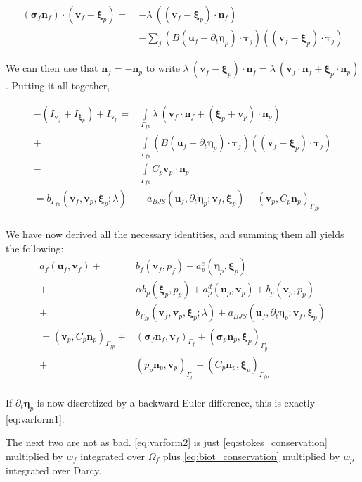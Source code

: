 \documentclass{article}
\newcommand{\mathspace}[1]{\ensuremath{#1}\xspace} %
\newcommand{\sigmabf}{\mathspace{\boldsymbol{\sigma}}}
\newcommand{\inner}[2]{\mathspace{\left (#1, #2 \right)}}
\newcommand{\ddt}[1]{\mathspace{\partial_t #1}}
\newcommand{\taubf}{\mathspace{\boldsymbol{\tau}}}
\newcommand{\stokes}{\mathspace{\Omega_{f}}}
\newcommand{\stokesbdy}{\mathspace{\Gamma_{f}}}
\newcommand{\darcybdy}{\mathspace{\Gamma_{p}}}
\newcommand{\interface}{\mathspace{\Gamma_{fp}}}
\newcommand{\nf}{\mathspace{\mathbf{n}_f}}
\newcommand{\np}{\mathspace{\mathbf{n}_p}}
\newcommand{\intI}{\mathspace{\int \limits_{\interface}}}
\newcommand{\uf}{\mathspace{\mathbf{u}_f}}
\newcommand{\vf}{\mathspace{\mathbf{v}_f}}
\newcommand{\up}{\mathspace{\mathbf{u}_p}}
\newcommand{\vp}{\mathspace{\mathbf{v}_p}}
\newcommand{\pf}{\mathspace{p_f}}
\newcommand{\pp}{\mathspace{p_p}}
\newcommand{\wf}{\mathspace{w_f}}
\renewcommand{\wp}{\mathspace{w_p}}
\newcommand{\disp}{\mathspace{\boldsymbol{\eta}_p}}
\newcommand{\disptest}{\mathspace{\boldsymbol{\xi}_p}}
\begin{document}
\begin{align*}
(\sigmabf_f \nf) \cdot (\vf - \disptest) =  \: &-\lambda\:  ((\vf - \disptest) \cdot \nf) \\
  &- \sum_j \left (B \left ( \uf - \ddt{\disp} \right ) \cdot \taubf_j \right ) ((\vf - \disptest) \cdot \taubf_j)
\end{align*}

We can then use that $\nf = - \np$ to write $\lambda \: (\vf - \disptest) \cdot \nf = \lambda \: (\vf  \cdot \nf + \disptest \cdot \np)$.
Putting it all together,

\begin{align*}
  -(I_{\vf} + I_{\disptest}) + I_{\vp}  =& \intI \lambda\: (\vf  \cdot \nf + (\disptest + \vp) \cdot \np) \\
  + &\intI \left (B \left ( \uf - \ddt{\disp} \right ) \cdot \taubf_j \right ) ((\vf - \disptest) \cdot \taubf_j) \\
  - &\intI C_p \vp \cdot \np \\
  = b_{\interface}\left (\vf, \vp, \disptest; \lambda \right ) & + a_{BJS}\left (\uf, \ddt{\disp}; \vf, \disptest \right) - \inner{\vp}{C_p\np}_{\interface} \\
\end{align*}

We have now derived all the necessary identities, and summing them all yields the following:
\begin{align*}
  a_f(\uf, \vf) +& b_f(\vf, \pf)  + a^e_p(\disp, \disptest)  \\ +&\alpha b_p(\disptest, \pp)  + a_p^d(\up, \vp) + b_p(\vp, \pp)  \\
  + &b_{\interface}\left (\vf, \vp, \disptest; \lambda \right ) + a_{BJS}\left (\uf, \ddt{\disp}; \vf, \disptest \right)\\
  = \inner{\vp}{C_p\np}_{\interface} +& (\sigmabf_f\nf, \vf)_{\stokesbdy} + (\sigmabf_p\np, \disptest)_{\darcybdy} \\
  + &(\pp\np, \vp)_{\darcybdy} + \inner{C_p\np}{\disptest}_{\interface}\\
\end{align*}

If \ddt{\disp} is now discretized by a backward Euler difference, this is exactly \eqref{eq:varform1}.

The next two are not as bad. \eqref{eq:varform2} is just \eqref{eq:stokes_conservation} multiplied by \wf integrated over \stokes plus \eqref{eq:biot_conservation} multiplied by \wp integrated over Darcy.
\end{document}
